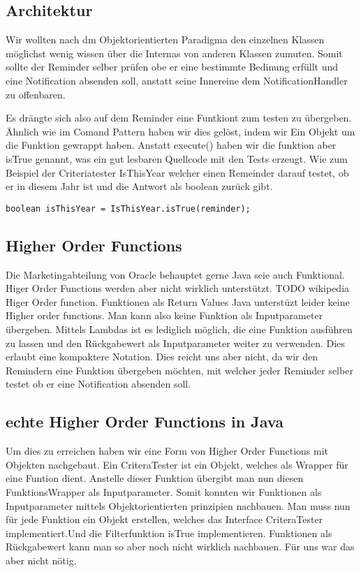 \subsection{Architektur}
Wir wollten nach dm Objektorientierten Paradigma den einzelnen Klassen möglichst wenig wissen über die Internas von anderen Klassen zumuten.
Somit sollte der Reminder selber prüfen obe er eine bestimmte Bedinung erfüllt und eine Notification absenden soll, anstatt seine Innereine dem NotificationHandler zu offenbaren. 

Es drängte sich also auf dem Reminder eine Funtkiont zum testen zu übergeben. Ähnlich wie im Comand Pattern haben wir dies gelöst, indem wir Ein Objekt um die Funktion gewrappt haben. Anstatt execute() haben wir die funktion aber isTrue genannt, was ein gut lesbaren Quellcode mit den Tests erzeugt.
Wie zum Beispiel der Criteriatester IsThisYear welcher einen Remeinder darauf testet, ob er in diesem Jahr ist und die Antwort als boolean zurück gibt.
\begin{lstlisting}
boolean isThisYear = IsThisYear.isTrue(reminder);
\end{lstlisting}
\subsection{ Higher Order Functions}
  Die Marketingabteilung von Oracle behauptet gerne Java seie auch Funktional. Higer Order Functions werden aber nicht wirklich unterstützt. 
  TODO wikipedia Higer Order function. 
  Funktionen als Return Values 	 
  Java unterstüzt leider keine Higher order functions. Man kann also keine Funktion als Inputparameter übergeben.
  Mittels Lambdas ist es lediglich möglich, die eine Funktion ausführen zu lassen und den Rückgabewert als Inputparameter weiter zu verwenden. Dies erlaubt eine kompaktere Notation. Dies reicht uns aber nicht, da wir den Remindern eine Funktion übergeben möchten, mit welcher jeder Reminder selber testet ob er eine Notification absenden soll. 
  
  \subsection{echte Higher Order Functions in Java}
  Um dies zu erreichen haben wir eine Form von Higher Order Functions mit Objekten nachgebaut. 
  Ein CriteraTester ist ein Objekt, welches als Wrapper für eine Funtion dient. Anstelle dieser Funktion übergibt man nun diesen FunktionsWrapper als Inputparameter. Somit konnten wir Funktionen als Inputparameter mittels Objektorientierten prinzipien nachbauen.
  Man muss nun für jede Funktion ein Objekt erstellen, welches das Interface CriteraTester implementiert.Und die Filterfunktion isTrue implementieren.
  Funktionen als Rückgabewert kann man so aber noch nicht wirklich nachbauen. Für uns war das aber nicht nötig.
  
